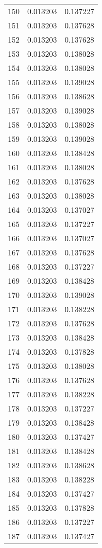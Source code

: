 \begin{longtable}{rrr}
150 & 0.013203 & 0.137227 \\
151 & 0.013203 & 0.137628 \\
152 & 0.013203 & 0.137628 \\
153 & 0.013203 & 0.138028 \\
154 & 0.013203 & 0.138028 \\
155 & 0.013203 & 0.139028 \\
156 & 0.013203 & 0.138628 \\
157 & 0.013203 & 0.139028 \\
158 & 0.013203 & 0.138028 \\
159 & 0.013203 & 0.139028 \\
160 & 0.013203 & 0.138428 \\
161 & 0.013203 & 0.138028 \\
162 & 0.013203 & 0.137628 \\
163 & 0.013203 & 0.138028 \\
164 & 0.013203 & 0.137027 \\
165 & 0.013203 & 0.137227 \\
166 & 0.013203 & 0.137027 \\
167 & 0.013203 & 0.137628 \\
168 & 0.013203 & 0.137227 \\
169 & 0.013203 & 0.138428 \\
170 & 0.013203 & 0.139028 \\
171 & 0.013203 & 0.138228 \\
172 & 0.013203 & 0.137628 \\
173 & 0.013203 & 0.138428 \\
174 & 0.013203 & 0.137828 \\
175 & 0.013203 & 0.138028 \\
176 & 0.013203 & 0.137628 \\
177 & 0.013203 & 0.138228 \\
178 & 0.013203 & 0.137227 \\
179 & 0.013203 & 0.138428 \\
180 & 0.013203 & 0.137427 \\
181 & 0.013203 & 0.138428 \\
182 & 0.013203 & 0.138628 \\
183 & 0.013203 & 0.138228 \\
184 & 0.013203 & 0.137427 \\
185 & 0.013203 & 0.137828 \\
186 & 0.013203 & 0.137227 \\
187 & 0.013203 & 0.137427 \\

\end{longtable}
